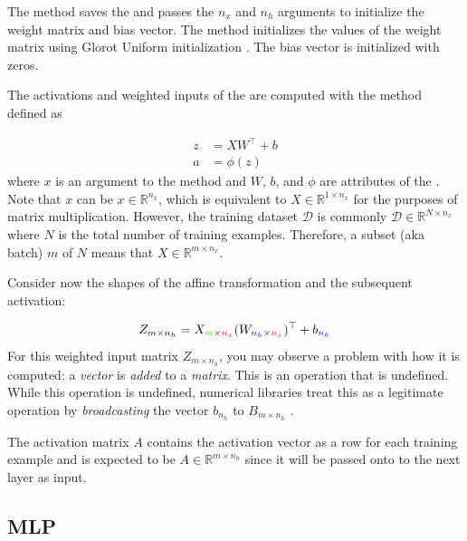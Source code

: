\documentclass{article}
\newcommand{\colorvar}[2]{
	\begingroup\color{#1}{#2}\endgroup
}
\begin{document}
The  method saves the  and passes
the $n_x$ and $n_h$ arguments to initialize the weight matrix and bias vector.
The  method initializes the values of the weight matrix
using Glorot Uniform initialization \cite{Glorot2010}. The bias vector is
initialized with zeros.

The activations and weighted inputs of the 
are computed with the  method defined as

\begin{align}
	z & = XW^{\top} + b \\
	a & = \phi(z)
\end{align}
where $x$ is an argument to the  method and
$W$, $b$, and $\phi$ are attributes of the .
Note that $x$ can be $x \in \mathbb{R}^{n_x}$, which
is equivalent to ${X \in \mathbb{R}^{1 \times n_x}}$ for the purposes of matrix
multiplication. However, the training dataset $\mathcal{D}$ is commonly
$\mathcal{D} \in \mathbb{R}^{N \times n_x}$ where $N$ is the total number of
training examples. Therefore, a subset (aka batch) $m$ of $N$ means that
$X \in \mathbb{R}^{m \times n_x}$.

Consider now the shapes of the affine transformation and the subsequent activation:

\begin{align}
	Z_{m \times n_h} =
	X_{\colorvar{green}{m} \times \colorvar{red}{n_x}} (W_{\colorvar{blue}{n_h} \times \colorvar{red}{n_x}})^{\top} + b_{\colorvar{blue}{n_h}}
\end{align}
For this weighted input matrix $Z_{m \times n_h}$, you may observe a problem with how
it is computed:
a \textit{vector} is \textit{added} to a \textit{matrix}. This is an operation that is undefined.
While this operation is undefined, numerical libraries treat this as a legitimate
operation by \textit{broadcasting} the vector $b_{n_h}$ to $B_{m \times n_h}$ \cite{Goodfellow2016,NumPyBroadcasting2021}.

The activation matrix $A$ contains the activation vector as a row
for each training example and is expected to be $A \in \mathbb{R}^{m \times n_h}$
since it will be passed onto to the next layer as input.

\subsection{MLP}
\end{document}
